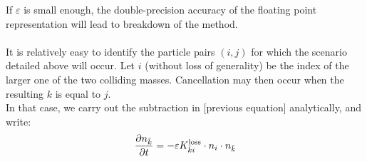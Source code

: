         If $\varepsilon$ is small enough, the double-precision accuracy of the floating point 
        representation will lead to breakdown of the method.\\
        \\
        
        It is relatively easy to identify the particle pairs $(i,j)$ for which the scenario detailed 
        above will occur. Let $i$ (without loss of generality) be the index of the larger one of the two 
        colliding masses. Cancellation may then occur when the resulting $k$ is equal to $j$.\\
        
        In that case, we carry out the subtraction in [previous equation] analytically, and write:
        \begin{equation}
            \frac{\partial n_{\bar k}}{\partial t}
                =-\varepsilon K_{\bar ki}^{\text{loss}}\cdot n_i\cdot n_{\bar k}
        \end{equation}
    
        

